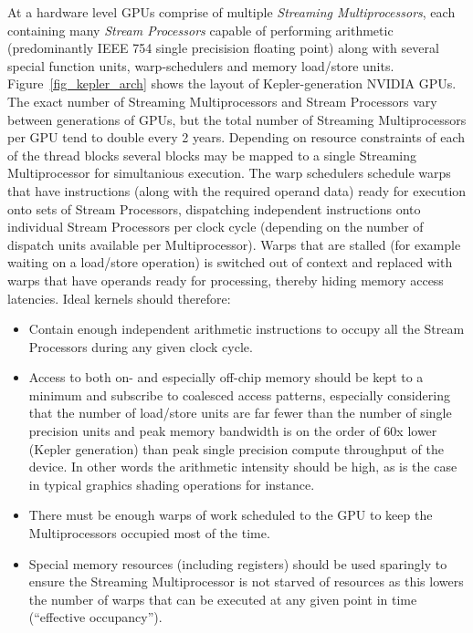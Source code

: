 At a hardware level GPUs comprise of multiple \textit{Streaming Multiprocessors}, each containing many \textit{Stream Processors} capable of performing arithmetic (predominantly IEEE 754 single precisision floating point) along
with several special function units, warp-schedulers and memory load/store units. Figure~\ref{fig_kepler_arch} shows the layout of Kepler-generation NVIDIA GPUs. The exact number of Streaming Multiprocessors and Stream Processors
vary between generations of GPUs, but the total number of Streaming Multiprocessors per GPU tend to double every 2 years. Depending on resource constraints of each of the thread blocks several blocks may be mapped to a single 
Streaming Multiprocessor for simultanious execution. The warp schedulers schedule warps that have instructions (along with the required operand data) ready for execution onto sets of Stream Processors, dispatching independent 
instructions onto individual Stream Processors per clock cycle (depending on the number of dispatch units available per Multiprocessor). Warps that are stalled (for example waiting on a load/store operation) is switched out of context
and replaced with warps that have operands ready for processing, thereby hiding memory access latencies. Ideal kernels should therefore:
\begin{itemize}
 \item Contain enough independent arithmetic instructions to occupy all the Stream Processors during
       any given clock cycle.
 \item Access to both on- and especially off-chip memory should be kept to a minimum and subscribe to coalesced access patterns, especially considering that the number of load/store units are far fewer than the number of
       single precision units and peak memory bandwidth is on the order of 60x lower (Kepler generation) than peak single precision compute throughput of the device. In other words the arithmetic intensity should be high, as
       is the case in typical graphics shading operations for instance.
 \item There must be enough warps of work scheduled to the GPU to keep the Multiprocessors occupied most of the time.
 \item Special memory resources (including registers) should be used sparingly to ensure the Streaming Multiprocessor is not starved of resources as this lowers the number of warps that can be executed at any given point in time 
      (``effective occupancy'').
\end{itemize}
